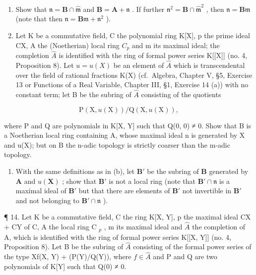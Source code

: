 \begin{enumerate}
\def\labelenumi{(\alph{enumi})}
\item
  Show that \(\mathfrak{n} = \mathbf{B} \cap \hat{\mathfrak{m}}\) and \(\mathbf{B} = \mathbf{A} + \mathfrak{n}\) . If further \(\mathfrak{n}^2 = \mathbf{B} \cap \hat{\mathfrak{m}}^2\) , then \(\mathfrak{n} = \mathbf{B}\mathfrak{m}\) (note that then \(\mathfrak{n} = \mathbf{B}\mathfrak{m} + \mathfrak{n}^2\) ).
\item
  Let K be a commutative field, C the polynomial ring K{[}X{]}, p the prime ideal CX, A the (Noetherian) local ring \(C_{p}\) and m its maximal ideal; the completion \(\hat{A}\) is identified with the ring of formal power series K{[}{[}X{]}{]} (no. 4, Proposition 8). Let \(u = u(X)\) be an element of \(\hat{A}\) which is transcendental over the field of rational fractions K(X) (cf.~Algebra, Chapter V, §5, Exercise 13 or Functions of a Real Variable, Chapter III, §1, Exercise 14 (a)) with no constant term; let B be the subring of \(\hat{A}\) consisting of the quotients
\end{enumerate}

\[
\mathrm{P} (\mathrm{X}, u (\mathrm{X})) / \mathrm{Q} (\mathrm{X}, u (\mathrm{X})),
\]

where P and Q are polynomials in K{[}X, Y{]} such that Q(0, 0) ≠ 0. Show that B is a Noetherian local ring containing A, whose maximal ideal n is generated by X and u(X); but on B the n-adic topology is strictly coarser than the m-adic topology.

\begin{enumerate}
\def\labelenumi{(\alph{enumi})}
\setcounter{enumi}{2}
\tightlist
\item
  With the same definitions as in (b), let \(\mathbf{B}'\) be the subring of \(\mathbf{B}\) generated by \(\mathbf{A}\) and \(u(\mathbf{X})\) ; show that \(\mathbf{B}'\) is not a local ring (note that \(\mathbf{B}' \cap \mathfrak{n}\) is a maximal ideal of \(\mathbf{B}'\) but that there are elements of \(\mathbf{B}'\) not invertible in \(\mathbf{B}'\) and not belonging to \(\mathbf{B}' \cap \mathfrak{n}\) ).
\end{enumerate}

¶ 14. Let K be a commutative field, C the ring K{[}X, Y{]}, p the maximal ideal CX + CY of C, A the local ring C \(_{p}\) , m its maximal ideal and \(\hat{A}\) the completion of A, which is identified with the ring of formal power series K{[}{[}X, Y{]}{]} (no. 4, Proposition 8). Let B be the subring of \(\hat{A}\) consisting of the formal power series of the type Xf(X, Y) + (P(Y)/Q(Y)), where \(f \in \hat{A}\) and P and Q are two polynomials of K{[}Y{]} such that Q(0) ≠ 0.

